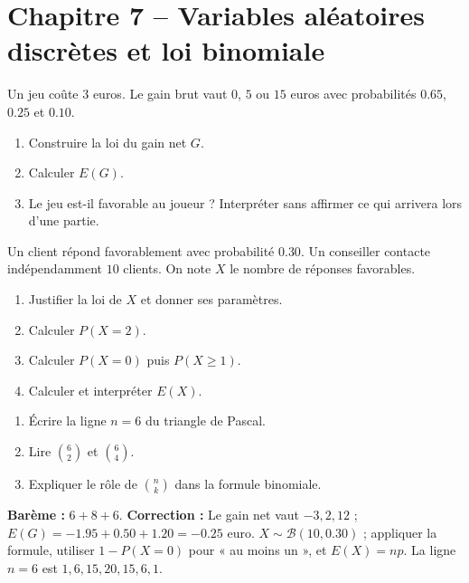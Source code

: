 \section*{Chapitre 7 -- Variables aléatoires discrètes et loi binomiale}
\begin{exercise}
Un jeu coûte $3$ euros. Le gain brut vaut $0$, $5$ ou $15$ euros avec probabilités $\num{0,65}$, $\num{0,25}$ et $\num{0,10}$.
\begin{enumerate}
\item Construire la loi du gain net $G$.
\item Calculer $E(G)$.
\item Le jeu est-il favorable au joueur ? Interpréter sans affirmer ce qui arrivera lors d'une partie.
\end{enumerate}
\end{exercise}
\begin{exercise}
Un client répond favorablement avec probabilité $\num{0,30}$. Un conseiller contacte indépendamment $10$ clients. On note $X$ le nombre de réponses favorables.
\begin{enumerate}
\item Justifier la loi de $X$ et donner ses paramètres.
\item Calculer $P(X=2)$.
\item Calculer $P(X=0)$ puis $P(X\geq1)$.
\item Calculer et interpréter $E(X)$.
\end{enumerate}
\end{exercise}
\begin{exercise}
\begin{enumerate}
\item Écrire la ligne $n=6$ du triangle de Pascal.
\item Lire $\binom62$ et $\binom64$.
\item Expliquer le rôle de $\binom nk$ dans la formule binomiale.
\end{enumerate}
\end{exercise}
\begin{solution}\textbf{Barème :} $6+8+6$. \textbf{Correction :} Le gain net vaut $-3,2,12$ ; $E(G)=-\num{1,95}+\num{0,50}+\num{1,20}=-\num{0,25}$ euro. $X\sim\mathcal B(10,\num{0,30})$ ; appliquer la formule, utiliser $1-P(X=0)$ pour « au moins un », et $E(X)=np$. La ligne $n=6$ est $1,6,15,20,15,6,1$.\end{solution}

